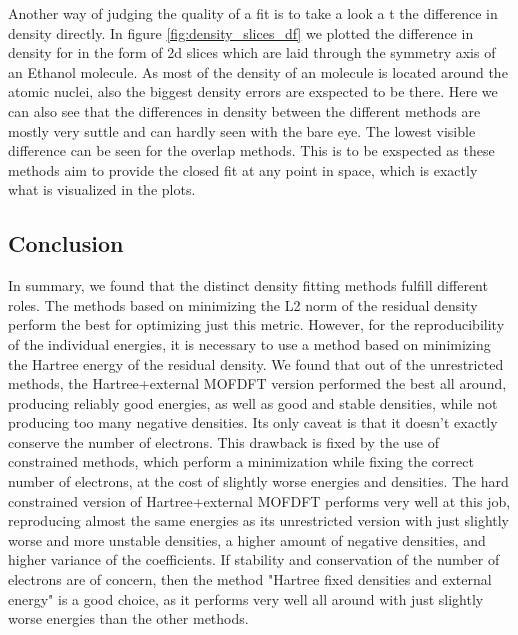 Another way of judging the quality of a fit is to take a look a t the difference in density directly. In figure \ref{fig:density_slices_df} we plotted the difference in density for in the form of 2d slices which are laid through the symmetry axis of an Ethanol molecule. As most of the density of an molecule is located around the atomic nuclei, also the biggest density errors are exspected to be there. Here we can also see that the differences in density between the different methods are mostly very suttle and can hardly seen with the bare eye. The lowest visible difference can be seen for the overlap methods. This is to be exspected as these methods aim to provide the closed fit at any point in space, which is exactly what is visualized in the plots.
\subsection{Conclusion}
In summary, we found that the distinct density fitting methods fulfill different roles. The methods based on minimizing the L2 norm of the residual density perform the best for optimizing just this metric. However, for the reproducibility of the individual energies, it is necessary to use a method based on minimizing the Hartree energy of the residual density. We found that out of the unrestricted methods, the Hartree+external MOFDFT version performed the best all around, producing reliably good energies, as well as good and stable densities, while not producing too many negative densities. Its only caveat is that it doesn't exactly conserve the number of electrons. This drawback is fixed by the use of constrained methods, which perform a minimization while fixing the correct number of electrons, at the cost of slightly worse energies and densities. The hard constrained version of Hartree+external MOFDFT performs very well at this job, reproducing almost the same energies as its unrestricted version with just slightly worse and more unstable densities, a higher amount of negative densities, and higher variance of the coefficients. If stability and conservation of the number of electrons are of concern, then the method "Hartree fixed densities and external energy" is a good choice, as it performs very well all around with just slightly worse energies than the other methods.








